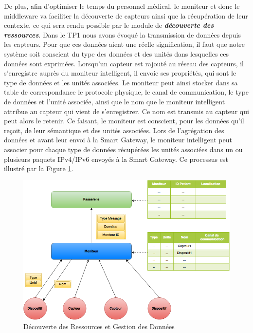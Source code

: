 De plus, afin d'optimiser le temps du personnel médical, le moniteur et donc le middleware va faciliter la découverte de capteurs ainsi que la récupération de leur contexte, ce qui sera rendu possible par le module de \textbf{\textit{découverte des ressources}}. Dans le TP1 nous avons évoqué la transmission de données depuis les capteurs. Pour que ces données aient une réelle signification, il faut que notre système soit conscient du type des données et des unités dans lesquelles ces données sont exprimées. Lorsqu’un capteur est rajouté au réseau des capteurs, il s’enregistre auprès du moniteur intelligent, il envoie ses propriétés, qui sont le type de données et les unités associées. Le moniteur peut ainsi stocker dans sa table de correspondance le protocole physique, le canal de communication, le type de données et l’unité associée, ainsi que le nom que le moniteur intelligent attribue au capteur qui vient de s’enregistrer. Ce nom est transmis au capteur qui peut alors le retenir. Ce faisant, le moniteur est conscient, pour les données qu’il reçoit, de leur sémantique et des unités associées. Lors de l’agrégation des données et avant leur envoi à la Smart Gateway, le moniteur intelligent peut associer pour chaque type de données récupérées les unités associées dans un ou plusieurs paquets IPv4/IPv6 envoyés à la Smart Gateway. Ce processus est illustré par la Figure \ref{5}.
\newline
\begin{figure}[h!]
	\hspace*{-3cm}
	\centering
	\includegraphics[width=1.5\textwidth]{Figure5.png}
	\caption{Découverte des Ressources et Gestion des Données}
	\label{5}
\end{figure}

